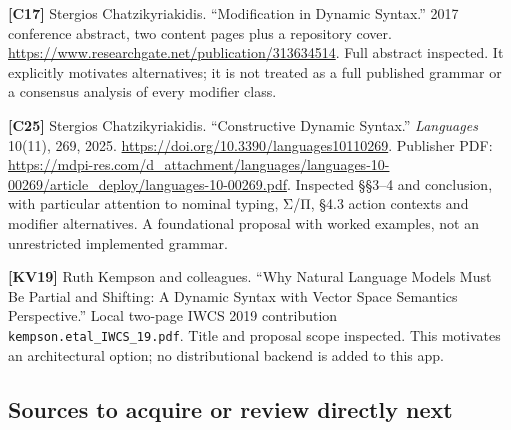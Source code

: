 \documentclass[11pt,a4paper]{article}
\begin{document}
\textbf{{[}C17{]}} Stergios Chatzikyriakidis. ``Modification in Dynamic
Syntax.'' 2017 conference abstract, two content pages plus a repository
cover. \url{https://www.researchgate.net/publication/313634514}. Full
abstract inspected. It explicitly motivates alternatives; it is not
treated as a full published grammar or a consensus analysis of every
modifier class.

\textbf{{[}C25{]}} Stergios Chatzikyriakidis. ``Constructive Dynamic
Syntax.'' \emph{Languages} 10(11), 269, 2025.
\url{https://doi.org/10.3390/languages10110269}. Publisher PDF:
\url{https://mdpi-res.com/d_attachment/languages/languages-10-00269/article_deploy/languages-10-00269.pdf}.
Inspected §§3--4 and conclusion, with particular attention to nominal
typing, Σ/Π, §4.3 action contexts and modifier alternatives. A
foundational proposal with worked examples, not an unrestricted
implemented grammar.

\textbf{{[}KV19{]}} Ruth Kempson and colleagues. ``Why Natural Language
Models Must Be Partial and Shifting: A Dynamic Syntax with Vector Space
Semantics Perspective.'' Local two-page IWCS 2019 contribution
\nolinkurl{kempson.etal_IWCS_19.pdf}. Title and proposal scope
inspected. This motivates an architectural option; no distributional
backend is added to this app.

\subsection{Sources to acquire or review directly
next}\label{sources-to-acquire-or-review-directly-next}
\end{document}
